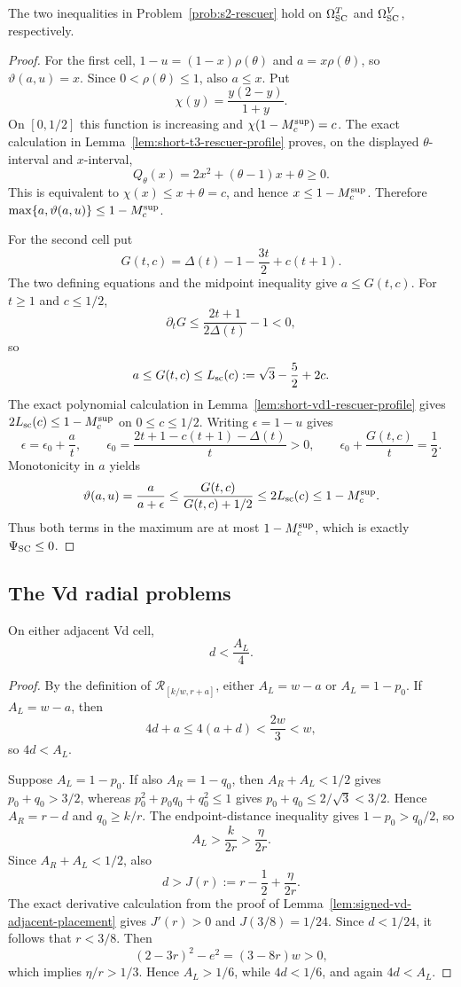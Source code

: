 \begin{theorem}[Pure S2-SC]
\label{thm:s2-univ-sc}
The two inequalities in Problem~\ref{prob:s2-rescuer} hold on
$\Omega_{\rm SC}^{T}$ and $\Omega_{\rm SC}^{V}$, respectively.
\end{theorem}

\begin{proof}
For the first cell, $1-u=(1-x)\rho(\theta)$ and
$a=x\rho(\theta)$, so $\vartheta(a,u)=x$.  Since
$0<\rho(\theta)\le1$, also $a\le x$.  Put
\[
 \chi(y)=\frac{y(2-y)}{1+y}.
\]
On $[0,1/2]$ this function is increasing and
$\chi(1-M_c^{\rm sup})=c$.  The exact calculation in
Lemma~\ref{lem:short-t3-rescuer-profile} proves, on the displayed
$\theta$-interval and $x$-interval,
\[
 Q_\theta(x)=2x^2+(\theta-1)x+\theta\ge0.
\]
This is equivalent to $\chi(x)\le x+\theta=c$, and hence
$x\le 1-M_c^{\rm sup}$.  Therefore
$\max\{a,\vartheta(a,u)\}\le 1-M_c^{\rm sup}$.

For the second cell put
\[
 G(t,c)=\Delta(t)-1-\frac{3t}{2}+c(t+1).
\]
The two defining equations and the midpoint inequality give $a\le G(t,c)$.
For $t\ge1$ and $c\le1/2$,
\[
 \partial_tG
 \le\frac{2t+1}{2\Delta(t)}-1<0,
\]
so
\[
 a\le G(t,c)\le L_{\rm sc}(c):=\sqrt3-\frac52+2c.
\]
The exact polynomial calculation in
Lemma~\ref{lem:short-vd1-rescuer-profile} gives
$2L_{\rm sc}(c)\le 1-M_c^{\rm sup}$ on $0\le c\le1/2$.
Writing $\epsilon=1-u$ gives
\[
 \epsilon=\epsilon_0+\frac at,
 \qquad
 \epsilon_0=\frac{2t+1-c(t+1)-\Delta(t)}t>0,
 \qquad
 \epsilon_0+\frac{G(t,c)}t=\frac12.
\]
Monotonicity in $a$ yields
\[
 \vartheta(a,u)
 =\frac a{a+\epsilon}
 \le\frac{G(t,c)}{G(t,c)+1/2}
 \le2L_{\rm sc}(c)
 \le 1-M_c^{\rm sup}.
\]
Thus both terms in the maximum are at most $1-M_c^{\rm sup}$, which is
exactly $\Psi_{\rm SC}\le0$.
\end{proof}

\subsection{The Vd radial problems}

\begin{lemma}
\label{lem:s2-pure-adjacent-quarter}
On either adjacent Vd cell,
\[
 d<\frac{A_L}{4}.
\]
\end{lemma}

\begin{proof}
By the definition of $\mathcal R_{[k/w,r+a]}$, either
$A_L=w-a$ or $A_L=1-p_0$.
If $A_L=w-a$, then
\[
 4d+a\le4(a+d)<\frac{2w}{3}<w,
\]
so $4d<A_L$.

Suppose $A_L=1-p_0$.  If also $A_R=1-q_0$, then
$A_R+A_L<1/2$ gives
$p_0+q_0>3/2$, whereas
$p_0^2+p_0q_0+q_0^2\le1$ gives
$p_0+q_0\le2/\sqrt3<3/2$.  Hence $A_R=r-d$ and $q_0\ge k/r$.
The endpoint-distance inequality gives $1-p_0>q_0/2$, so
\[
 A_L>\frac{k}{2r}>\frac\eta{2r}.
\]
Since $A_R+A_L<1/2$, also
\[
 d>J(r):=r-\frac12+\frac\eta{2r}.
\]
The exact derivative calculation from the proof of
Lemma~\ref{lem:signed-vd-adjacent-placement} gives $J'(r)>0$ and
$J(3/8)=1/24$.  Since $d<1/24$, it follows that $r<3/8$.  Then
\[
 (2-3r)^2-e^2=(3-8r)w>0,
\]
which implies $\eta/r>1/3$.  Hence $A_L>1/6$, while $4d<1/6$, and again
$4d<A_L$.
\end{proof}

